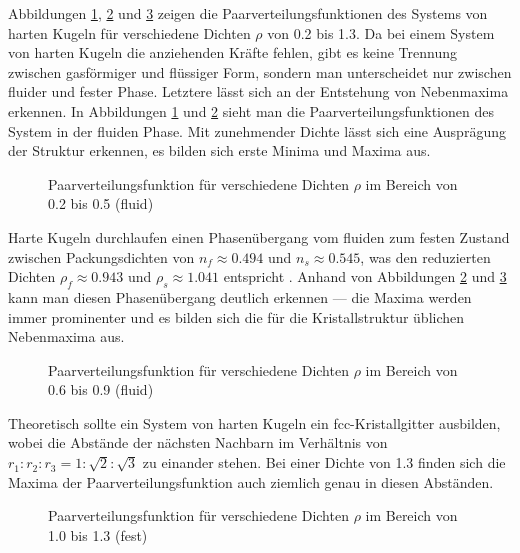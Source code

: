 Abbildungen \ref{fig:paarverteilung1}, \ref{fig:paarverteilung2} und \ref{fig:paarverteilung3} zeigen die Paarverteilungsfunktionen des Systems von harten Kugeln für verschiedene Dichten $\rho$ von 0.2 bis 1.3. Da bei einem System von harten Kugeln die anziehenden Kräfte fehlen, gibt es keine  Trennung zwischen gasförmiger und flüssiger Form, sondern man unterscheidet nur zwischen fluider und fester Phase. Letztere lässt sich an der Entstehung von Nebenmaxima erkennen. In Abbildungen  \ref{fig:paarverteilung1} und \ref{fig:paarverteilung2} sieht man die Paarverteilungsfunktionen des System in der fluiden Phase. Mit zunehmender Dichte lässt sich eine Ausprägung der Struktur erkennen, es bilden sich erste Minima und Maxima aus.  
\begin{figure}[H]
 \centering
 \resizebox{0.9\textwidth}{!}{}
 \caption{Paarverteilungsfunktion für verschiedene Dichten $\rho$ im Bereich von 0.2 bis 0.5 (fluid)}
 \label{fig:paarverteilung1}
\end{figure} 

Harte Kugeln durchlaufen einen Phasenübergang vom fluiden zum festen Zustand zwischen Packungsdichten von $n_f \approx 0.494$ und $n_s \approx 0.545$, was den reduzierten Dichten $\rho_f \approx 0.943$ und $\rho_s \approx 1.041$ entspricht \cite{Hansen1986}. Anhand von Abbildungen \ref{fig:paarverteilung2} und \ref{fig:paarverteilung3} kann man diesen Phasenübergang deutlich erkennen --- die Maxima werden immer prominenter und es bilden sich die für die Kristallstruktur üblichen Nebenmaxima aus.   
\begin{figure}[H]
 \centering
 \resizebox{0.9\textwidth}{!}{}
  \caption{Paarverteilungsfunktion für verschiedene Dichten $\rho$ im Bereich von 0.6 bis 0.9 (fluid) }
 \label{fig:paarverteilung2}
\end{figure} 
 
Theoretisch sollte ein System von harten Kugeln ein fcc-Kristallgitter ausbilden, wobei die Abstände der nächsten Nachbarn im Verhältnis von $r_1 : r_2 : r_3 = 1 : \sqrt{2} : \sqrt{3}$ zu einander stehen. Bei einer Dichte von 1.3 finden sich die Maxima der Paarverteilungsfunktion auch ziemlich genau in diesen Abständen. 
 
\begin{figure}[H]
 \centering
  \resizebox{0.9\textwidth}{!}{}
 \caption{Paarverteilungsfunktion für verschiedene Dichten $\rho$ im Bereich von 1.0 bis 1.3 (fest) }
 \label{fig:paarverteilung3}
\end{figure} 
 
